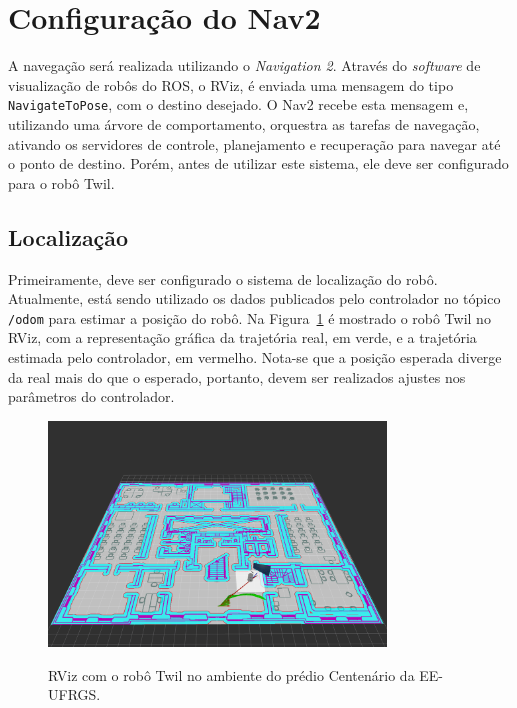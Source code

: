 \documentclass[repeatfields,xlists,xpacks,oneside,yearsonly]{ufrgscca}
\begin{document}
\section{Configuração do Nav2}

A navegação será realizada utilizando o \textit{Navigation 2}.
Através do \textit{software} de visualização de robôs do ROS, o RViz,
é enviada uma mensagem do tipo \texttt{NavigateToPose}, com o destino desejado.
O Nav2 recebe esta mensagem e, utilizando uma árvore de comportamento,
orquestra as tarefas de navegação, ativando os servidores de controle, planejamento
e recuperação para navegar até o ponto de destino.
Porém, antes de utilizar este sistema, ele deve ser configurado para o robô Twil.

\subsection{Localização}


Primeiramente, deve ser configurado o sistema de localização do robô.
Atualmente, está sendo utilizado os dados publicados pelo controlador no
tópico \texttt{/odom} para estimar a posição do robô.
Na Figura~\ref{fig:robo_rviz} é mostrado o robô Twil no RViz, com a representação
gráfica da trajetória real, em verde, e a trajetória estimada pelo controlador,
em vermelho.
Nota-se que a posição esperada diverge da real mais do que o esperado, portanto,
devem ser realizados ajustes nos parâmetros do controlador.

\begin{figure}[htbp]
    {
        \centering
        \caption{RViz com o robô Twil no ambiente do prédio Centenário da EE-UFRGS.}
        \label{fig:robo_rviz}
        \includegraphics[width=0.8\textwidth]{erro_de_odometria.png}\\
    }
    {}
\end{figure}
\end{document}
